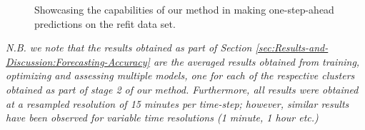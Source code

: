 \begin{figure}[H]
    \begin{adjustwidth}{-3.0cm}{-3.0cm}%
            \myfloatalign
             \quad
             \quad
            \caption{Showcasing the capabilities of our method in making one-step-ahead predictions on the \gls{refit} data set.}
    \end{adjustwidth}
\end{figure}

\noindent \newline \textit{N.B. we note that the results obtained as part of Section \ref{sec:Results-and-Discussion:Forecasting-Accuracy} are the averaged results obtained from training, optimizing and assessing multiple models, one for each of the respective clusters obtained as part of stage 2 of our method. Furthermore, all results were obtained at a resampled resolution of 15 minutes per time-step; however, similar results have been observed for variable time resolutions (1 minute, 1 hour etc.)}